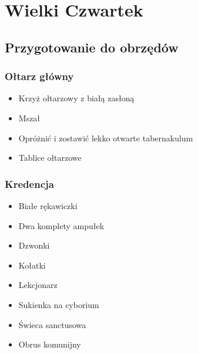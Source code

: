 \chapter{Wielki Czwartek }

\section{Przygotowanie do obrzędów}

\subsection{Ołtarz główny}

\begin{itemize}
    \item Krzyż ołtarzowy z białą zasłoną
    \item Mszał
    \item Opróżnić i zostawić lekko otwarte tabernakulum
    \item Tablice ołtarzowe
\end{itemize}



\subsection{Kredencja}

\begin{itemize}
    \item Białe rękawiczki
    \item Dwa komplety ampułek
    \item Dzwonki
    \item Kołatki
    \item Lekcjonarz
    \item Sukienka na cyborium
    \item Świeca sanctusowa
    \item Obrus komunijny
\end{itemize}

